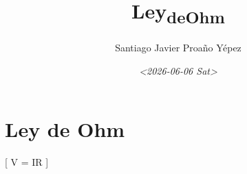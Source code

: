 \documentclass[11pt]{article}
\author{Santiago Javier Proaño Yépez}
\date{\textit{<2026-06-06 Sat>}}
\title{Ley\textsubscript{de}\textsubscript{Ohm}}
\begin{document}
\maketitle
\tableofcontents

\section{Ley de Ohm}
\label{sec:org2d34c18}

[
V = IR
]
\end{document}
